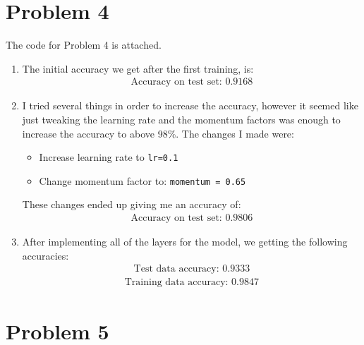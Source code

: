 \documentclass[letterpaper, 12pt]{article}
\begin{document}
\section*{Problem 4}
The code for Problem 4 is attached.
\begin{enumerate}
    \item The initial accuracy we get after the first training, is:
    \begin{align*}
        \text{Accuracy on test set: } 0.9168
    \end{align*}
    \item I tried several things in order to increase the accuracy, however it seemed like just tweaking the learning rate and the momentum factors was enough to increase the accuracy to above 98\%.
    The changes I made were:
    \begin{itemize}
    \item Increase learning rate to \verb|lr=0.1|
    \item Change momentum factor to: \verb|momentum = 0.65| 
    \end{itemize}
    These changes ended up giving me an accuracy of:
    \begin{align*}
        \text{Accuracy on test set: } 0.9806
    \end{align*}
    \item After implementing all of the layers for the model, we getting the following accuracies:
    \begin{align*}
        \text{Test data accuracy: } 0.9333
    \end{align*}
    \begin{align*}
        \text{Training data accuracy: } 0.9847
    \end{align*}
    
\end{enumerate}
\vspace{3mm}
\section*{Problem 5}
\end{document}

